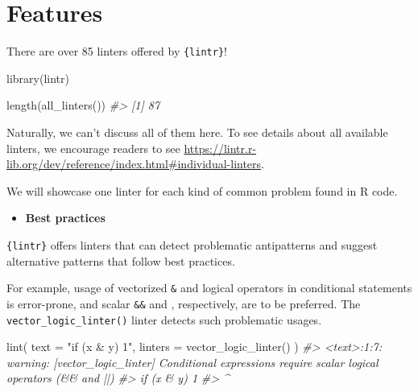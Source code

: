 \documentclass[10pt,a4paper,onecolumn]{article}
\newenvironment{Shaded}{\begin{snugshade}}{\end{snugshade}}
\newcommand{\AttributeTok}[1]{\textcolor[rgb]{0.77,0.63,0.00}{#1}}
\newcommand{\CommentTok}[1]{\textcolor[rgb]{0.56,0.35,0.01}{\textit{#1}}}
\newcommand{\FunctionTok}[1]{\textcolor[rgb]{0.00,0.00,0.00}{#1}}
\newcommand{\NormalTok}[1]{#1}
\newcommand{\StringTok}[1]{\textcolor[rgb]{0.31,0.60,0.02}{#1}}
\providecommand{\tightlist}{%
  \setlength{\itemsep}{0pt}\setlength{\parskip}{0pt}}
\begin{document}
\hypertarget{features}{%
\section{Features}\label{features}}

There are over 85 linters offered by \texttt{\{lintr\}}!

\begin{Shaded}
\begin{Highlighting}[]
\FunctionTok{library}\NormalTok{(lintr)}

\FunctionTok{length}\NormalTok{(}\FunctionTok{all\_linters}\NormalTok{())}
\CommentTok{\#\textgreater{} [1] 87}
\end{Highlighting}
\end{Shaded}

Naturally, we can't discuss all of them here. To see details about all
available linters, we encourage readers to see
\url{https://lintr.r-lib.org/dev/reference/index.html\#individual-linters}.

We will showcase one linter for each kind of common problem found in R
code.

\begin{itemize}
\tightlist
\item
  \textbf{Best practices}
\end{itemize}

\texttt{\{lintr\}} offers linters that can detect problematic
antipatterns and suggest alternative patterns that follow best
practices.

For example, usage of vectorized \texttt{\&} and \texttt{\textbar{}}
logical operators in conditional statements is error-prone, and scalar
\texttt{\&\&} and \texttt{\textbar{}\textbar{}}, respectively, are to be
preferred. The \texttt{vector\_logic\_linter()} linter detects such
problematic usages.

\begin{Shaded}
\begin{Highlighting}[]
\FunctionTok{lint}\NormalTok{(}
  \AttributeTok{text =} \StringTok{"if (x \& y) 1"}\NormalTok{,}
  \AttributeTok{linters =} \FunctionTok{vector\_logic\_linter}\NormalTok{()}
\NormalTok{)}
\CommentTok{\#\textgreater{} \textless{}text\textgreater{}:1:7: warning: [vector\_logic\_linter] Conditional expressions require scalar logical operators (\&\& and ||)}
\CommentTok{\#\textgreater{} if (x \& y) 1}
\CommentTok{\#\textgreater{}       \^{}}
\end{Highlighting}
\end{Shaded}
\end{document}
